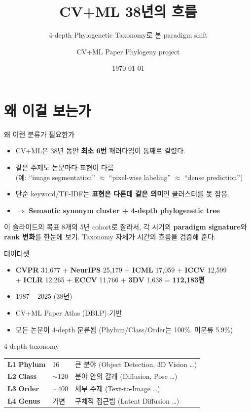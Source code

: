 \documentclass[aspectratio=169,t]{beamer}
\title[CV+ML 38년]{CV+ML 38년의 흐름}
\subtitle{4-depth Phylogenetic Taxonomy로 본 paradigm shift}
\author[Phylogeny]{CV+ML Paper Phylogeny project}
\institute[112{,}183 papers]{CVPR · NeurIPS · ICML · ICCV · ICLR · ECCV · 3DV, 1987--2025}
\date{\today}
\newcommand{\hot}[1]{\textcolor{accentorange}{\textbf{#1}}}
\newcommand{\cool}[1]{\textcolor{accentblue}{\textbf{#1}}}
\newcommand{\muted}[1]{\textcolor{mutedgray}{#1}}
\begin{document}
\frame{\titlepage}

\section{왜 이걸 보는가}

\begin{frame}{왜 이런 분류가 필요한가}
\begin{itemize}
  \item CV+ML은 38년 동안 \hot{최소 6번} 패러다임이 통째로 갈렸다.
  \item 같은 주제도 논문마다 표현이 다름 \\
        \muted{(예: ``image segmentation'' $\approx$ ``pixel-wise labeling'' $\approx$ ``dense prediction'')}
  \item 단순 keyword/TF-IDF는 \hot{표현은 다른데 같은 의미}인 클러스터를 못 잡음.
  \item $\Rightarrow$ \cool{Semantic synonym cluster + 4-depth phylogenetic tree}
\end{itemize}
\vfill
\begin{block}{이 슬라이드의 목표}
8개의 5년 cohort로 잘라서, 각 시기의 \hot{paradigm signature}와
\hot{rank 변화}를 한눈에 보기. Taxonomy 자체가 시간의 흐름을 검증해 준다.
\end{block}
\end{frame}

\begin{frame}{데이터셋}
\begin{itemize}
  \item \cool{CVPR} 31{,}677 + \cool{NeurIPS} 25{,}179 + \cool{ICML} 17{,}059 + \cool{ICCV} 12{,}599 \\
        + \cool{ICLR} 12{,}265 + \cool{ECCV} 11{,}766 + \cool{3DV} 1{,}638 = \hot{112{,}183편}
  \item 1987 -- 2025 (38년)
  \item CV+ML Paper Atlas (DBLP) 기반
  \item 모든 논문이 4-depth 분류됨 (Phylum/Class/Order는 100\%, 미분류 5.9\%)
\end{itemize}
\vfill
\begin{block}{4-depth taxonomy}
\begin{tabular}{@{}lll@{}}
\textbf{L1} \textbf{Phylum} & 16   & 큰 분야 (Object Detection, 3D Vision \dots) \\
\textbf{L2} \textbf{Class}  & $\sim$120 & 분야 안의 갈래 (Diffusion, Pose \dots) \\
\textbf{L3} \textbf{Order}  & $\sim$400 & 세부 주제 (Text-to-Image \dots) \\
\textbf{L4} \textbf{Genus}  & 가변 & 구체적 접근법 (Latent Diffusion \dots) \\
\end{tabular}
\end{block}
\end{frame}
\end{document}
